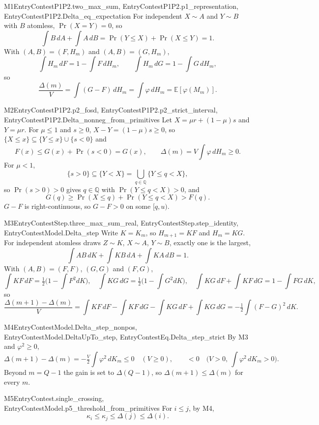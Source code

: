 \begin{mproof}{M1}{EntryContestP1P2.two_max_sum, EntryContestP1P2.p1_representation, EntryContestP1P2.Delta_eq_expectation}
For independent $X\sim A$ and $Y\sim B$ with $B$ atomless, $\Pr(X=Y)=0$, so
\[
  \int B\,dA+\int A\,dB=\Pr(Y\le X)+\Pr(X\le Y)=1 .
\]
With $(A,B)=(F,H_m)$ and $(A,B)=(G,H_m)$,
\[
  \int H_m\,dF=1-\int F\,dH_m,\qquad \int H_m\,dG=1-\int G\,dH_m ,
\]
so
\[
  \frac{\Delta(m)}{V}=\int (G-F)\,dH_m=\int\varphi\,dH_m=\mathbb E[\varphi(M_m)] .
\]
\end{mproof}

\begin{mproof}{M2}{EntryContestP1P2.p2_fosd, EntryContestP1P2.p2_strict_interval, EntryContestP1P2.Delta_nonneg_from_primitives}
Let $X=\mu r+(1-\mu)s$ and $Y=\mu r$. For $\mu\le1$ and $s\ge0$, $X-Y=(1-\mu)s\ge0$,
so $\{X\le x\}\subseteq\{Y\le x\}\cup\{s<0\}$ and
\[
  F(x)\le G(x)+\Pr(s<0)=G(x),\qquad \Delta(m)=V\!\int\varphi\,dH_m\ge0 .
\]
For $\mu<1$,
\[
  \{s>0\}\subseteq\{Y<X\}=\bigcup_{q\in\mathbb Q}\{Y\le q<X\},
\]
so $\Pr(s>0)>0$ gives $q\in\mathbb Q$ with $\Pr(Y\le q<X)>0$, and
\[
  G(q)\ge\Pr(X\le q)+\Pr(Y\le q<X)>F(q).
\]
$G-F$ is right-continuous, so $G-F>0$ on some $[q,u)$.
\end{mproof}

\begin{mproof}{M3}{EntryContestStep.three_max_sum_real, EntryContestStep.step_identity, EntryContestModel.Delta_step}
Write $K=K_m$, so $H_{m+1}=KF$ and $H_m=KG$. For independent atomless draws
$Z\sim K$, $X\sim A$, $Y\sim B$, exactly one is the largest,
\[
  \int AB\,dK+\int KB\,dA+\int KA\,dB=1 .
\]
With $(A,B)=(F,F)$, $(G,G)$ and $(F,G)$,
\[
  \int KF\,dF=\tfrac12\Big(1-\int F^2dK\Big),\quad
  \int KG\,dG=\tfrac12\Big(1-\int G^2dK\Big),\quad
  \int KG\,dF+\int KF\,dG=1-\int FG\,dK ,
\]
so
\[
  \frac{\Delta(m{+}1)-\Delta(m)}{V}
  =\int KF\,dF-\int KF\,dG-\int KG\,dF+\int KG\,dG
  =-\tfrac12\int (F-G)^2\,dK .
\]
\end{mproof}

\begin{mproof}{M4}{EntryContestModel.Delta_step_nonpos, EntryContestModel.DeltaUpTo_step, EntryContestEq.Delta_step_strict}
By M3 and $\varphi^2\ge0$,
\[
  \Delta(m{+}1)-\Delta(m)=-\tfrac V2\int\varphi^2\,dK_m\le0 \quad (V\ge0),
  \qquad <0 \quad \Big(V>0,\ \int\varphi^2\,dK_m>0\Big).
\]
Beyond $m=Q-1$ the gain is set to $\Delta(Q-1)$, so $\Delta(m{+}1)\le\Delta(m)$
for every $m$.
\end{mproof}

\begin{mproof}{M5}{EntryContest.single_crossing, EntryContestModel.p5_threshold_from_primitives}
For $i\le j$, by M4,
\[
  \kappa_i\le\kappa_j\le\Delta(j)\le\Delta(i).
\]
\end{mproof}

